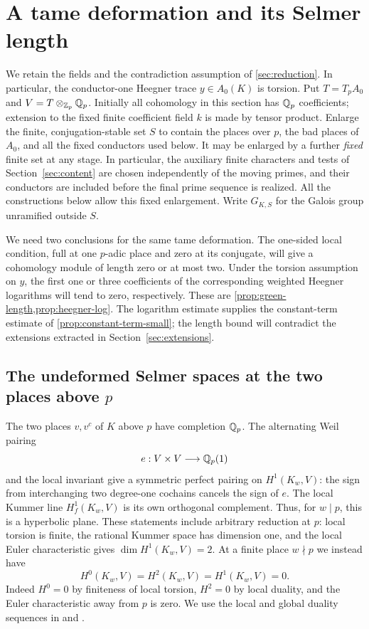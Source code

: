 \section{A tame deformation and its Selmer length}\label{sec:tame}

We retain the fields and the contradiction assumption of
\cref{sec:reduction}.  In particular, the conductor-one Heegner trace
$y\in A_0(K)$ is torsion.  Put $T=T_pA_0$ and
$V=T\otimes_{\mathbb Z_p}\mathbb Q_p$.  Initially all cohomology in this section has
$\mathbb Q_p$ coefficients; extension to the fixed finite coefficient field
$k$ is made by tensor product.  Enlarge the finite, conjugation-stable
set $S$ to contain the places over $p$, the bad places of $A_0$, and all
the fixed conductors used below.  It may be enlarged by a further
\emph{fixed} finite set at any stage.  In particular, the auxiliary
finite characters and tests of Section~\ref{sec:content} are chosen
independently of the moving primes, and their conductors are included
before the final prime sequence is realized.  All the constructions
below allow this fixed enlargement.  Write $G_{K,S}$ for the Galois
group unramified outside $S$.

We need two conclusions for the same tame deformation.  The
one-sided local condition, full at one $p$-adic place and zero at
its conjugate, will give a cohomology module of length zero or at
most two.  Under the torsion assumption on $y$, the first one or
three coefficients of the corresponding weighted Heegner logarithms
will tend to zero, respectively.  These are
\cref{prop:green-length,prop:heegner-log}.  The logarithm estimate
supplies the constant-term estimate of
\cref{prop:constant-term-small}; the length bound will contradict
the extensions extracted in Section~\ref{sec:extensions}.

\subsection{The undeformed Selmer spaces at the two places above \texorpdfstring{$p$}{p}}

The two places $v,v^c$ of $K$ above $p$ have completion $\mathbb Q_p$.
The alternating Weil pairing
\[
 e:V\times V\longrightarrow\mathbb Q_p(1)
\]
and the local invariant give a symmetric perfect pairing on
$H^1(K_w,V)$: the sign from interchanging two degree-one cochains
cancels the sign of $e$.  The local Kummer line
$H^1_f(K_w,V)$ is its own orthogonal complement.  Thus, for $w\mid p$,
this is a hyperbolic plane.  These statements include arbitrary
reduction at $p$: local torsion is finite, the rational Kummer space
has dimension one, and the local Euler characteristic gives
$\dim H^1(K_w,V)=2$.  At a finite place $w\nmid p$ we instead have
\begin{equation}\label{eq:away-p-vanishing}
 H^0(K_w,V)=H^2(K_w,V)=H^1(K_w,V)=0.
\end{equation}
Indeed $H^0=0$ by finiteness of local torsion, $H^2=0$ by local
duality, and the Euler characteristic away from $p$ is zero.
We use the local and global duality sequences in
\cite[Chapter~I, Sections~2--4]{Milne1986} and
\cite[Section~8.6]{NSW2008}.

